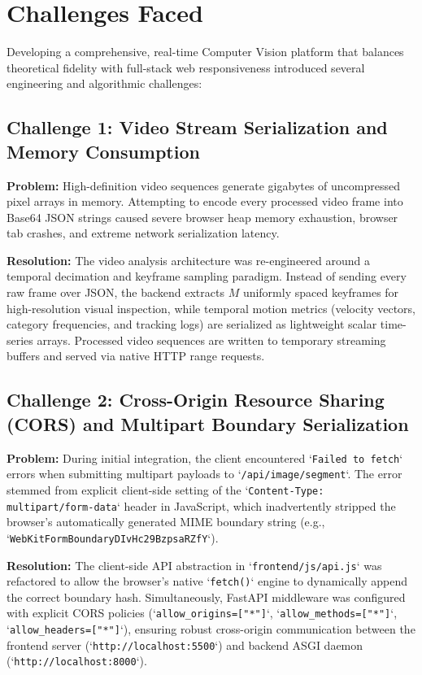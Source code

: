 \section{Challenges Faced}

Developing a comprehensive, real-time Computer Vision platform that balances theoretical fidelity with full-stack web responsiveness introduced several engineering and algorithmic challenges:

\subsection{Challenge 1: Video Stream Serialization and Memory Consumption}
\textbf{Problem:} High-definition video sequences generate gigabytes of uncompressed pixel arrays in memory. Attempting to encode every processed video frame into Base64 JSON strings caused severe browser heap memory exhaustion, browser tab crashes, and extreme network serialization latency.

\textbf{Resolution:} The video analysis architecture was re-engineered around a temporal decimation and keyframe sampling paradigm. Instead of sending every raw frame over JSON, the backend extracts $M$ uniformly spaced keyframes for high-resolution visual inspection, while temporal motion metrics (velocity vectors, category frequencies, and tracking logs) are serialized as lightweight scalar time-series arrays. Processed video sequences are written to temporary streaming buffers and served via native HTTP range requests.

\subsection{Challenge 2: Cross-Origin Resource Sharing (CORS) and Multipart Boundary Serialization}
\textbf{Problem:} During initial integration, the client encountered `\texttt{Failed to fetch}` errors when submitting multipart payloads to `\texttt{/api/image/segment}`. The error stemmed from explicit client-side setting of the `\texttt{Content-Type: multipart/form-data}` header in JavaScript, which inadvertently stripped the browser's automatically generated MIME boundary string (e.g., `\texttt{WebKitFormBoundaryDIvHc29BzpsaRZfY}`).

\textbf{Resolution:} The client-side API abstraction in `\texttt{frontend/js/api.js}` was refactored to allow the browser's native `\texttt{fetch()}` engine to dynamically append the correct boundary hash. Simultaneously, FastAPI middleware was configured with explicit CORS policies (`\texttt{allow\_origins=["*"]}`, `\texttt{allow\_methods=["*"]}`, `\texttt{allow\_headers=["*"]}`), ensuring robust cross-origin communication between the frontend server (`\texttt{http://localhost:5500}`) and backend ASGI daemon (`\texttt{http://localhost:8000}`).

